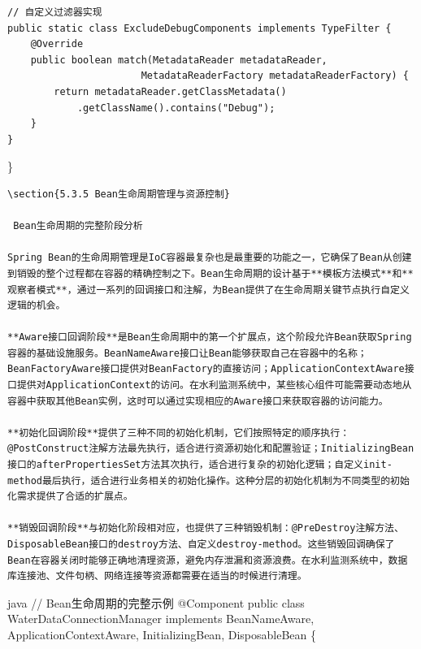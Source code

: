 \begin{verbatim}
// 自定义过滤器实现
public static class ExcludeDebugComponents implements TypeFilter {
    @Override
    public boolean match(MetadataReader metadataReader, 
                       MetadataReaderFactory metadataReaderFactory) {
        return metadataReader.getClassMetadata()
            .getClassName().contains("Debug");
    }
}
\end{verbatim}

\}

\begin{lstlisting}
\section{5.3.5 Bean生命周期管理与资源控制}

 Bean生命周期的完整阶段分析

Spring Bean的生命周期管理是IoC容器最复杂也是最重要的功能之一，它确保了Bean从创建到销毁的整个过程都在容器的精确控制之下。Bean生命周期的设计基于**模板方法模式**和**观察者模式**，通过一系列的回调接口和注解，为Bean提供了在生命周期关键节点执行自定义逻辑的机会。

**Aware接口回调阶段**是Bean生命周期中的第一个扩展点，这个阶段允许Bean获取Spring容器的基础设施服务。BeanNameAware接口让Bean能够获取自己在容器中的名称；BeanFactoryAware接口提供对BeanFactory的直接访问；ApplicationContextAware接口提供对ApplicationContext的访问。在水利监测系统中，某些核心组件可能需要动态地从容器中获取其他Bean实例，这时可以通过实现相应的Aware接口来获取容器的访问能力。

**初始化回调阶段**提供了三种不同的初始化机制，它们按照特定的顺序执行：@PostConstruct注解方法最先执行，适合进行资源初始化和配置验证；InitializingBean接口的afterPropertiesSet方法其次执行，适合进行复杂的初始化逻辑；自定义init-method最后执行，适合进行业务相关的初始化操作。这种分层的初始化机制为不同类型的初始化需求提供了合适的扩展点。

**销毁回调阶段**与初始化阶段相对应，也提供了三种销毁机制：@PreDestroy注解方法、DisposableBean接口的destroy方法、自定义destroy-method。这些销毁回调确保了Bean在容器关闭时能够正确地清理资源，避免内存泄漏和资源浪费。在水利监测系统中，数据库连接池、文件句柄、网络连接等资源都需要在适当的时候进行清理。
\end{lstlisting}

java // Bean生命周期的完整示例 @Component public class WaterDataConnectionManager implements BeanNameAware, ApplicationContextAware, InitializingBean, DisposableBean \{

